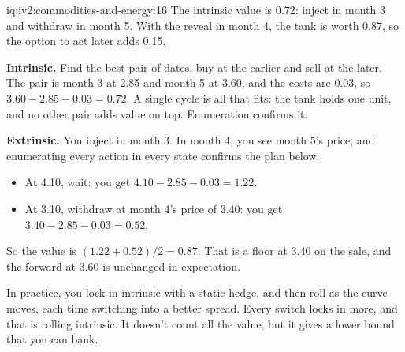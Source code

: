 \begin{solution}{iq:iv2:commodities-and-energy:16}
The intrinsic value is 0.72: inject in month 3 and withdraw in month 5. With the reveal in month 4, the tank is worth 0.87, so the option to act later adds 0.15.

\textbf{Intrinsic.} Find the best pair of dates, buy at the earlier and sell at the later. The pair is month 3 at 2.85 and month 5 at 3.60, and the costs are 0.03, so $3.60 - 2.85 - 0.03 = 0.72$. A single cycle is all that fits: the tank holds one unit, and no other pair adds value on top. Enumeration confirms it.

\textbf{Extrinsic.} You inject in month 3. In month 4, you see month 5's price, and enumerating every action in every state confirms the plan below.
\begin{itemize}
\item At 4.10, wait: you get $4.10 - 2.85 - 0.03 = 1.22$.
\item At 3.10, withdraw at month 4's price of 3.40: you get $3.40 - 2.85 - 0.03 = 0.52$.
\end{itemize}
So the value is $(1.22 + 0.52)/2 = 0.87$. That is a floor at 3.40 on the sale, and the forward at 3.60 is unchanged in expectation.

In practice, you lock in intrinsic with a static hedge, and then roll as the curve moves, each time switching into a better spread. Every switch locks in more, and that is rolling intrinsic. It doesn't count all the value, but it gives a lower bound that you can bank.

\end{solution}

